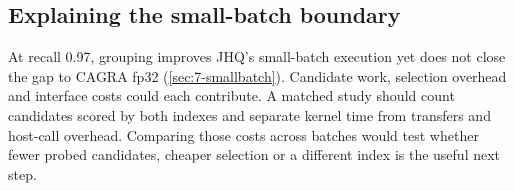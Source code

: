 \subsection{Explaining the small-batch boundary}

At recall 0.97, grouping improves JHQ's small-batch execution yet does
not close the gap to CAGRA fp32 (\cref{sec:7-smallbatch}). Candidate
work, selection overhead and interface costs could each contribute.
A matched study should count candidates scored by both indexes and
separate kernel time from transfers and host-call overhead. Comparing
those costs across batches would test whether fewer probed candidates,
cheaper selection or a different index is the useful next step.
